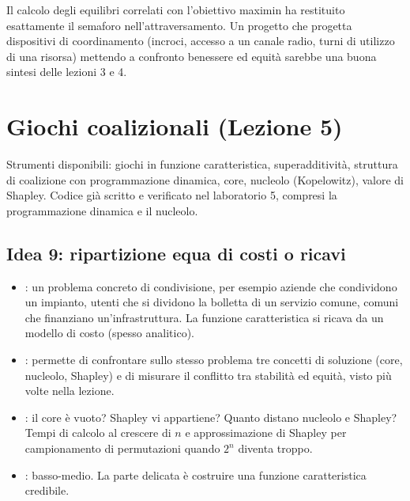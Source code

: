 \documentclass[11pt, a4paper, oneside, openany]{book}
\newcommand{\stato}[2]{\etichetta{#1}{#2}}
\newcommand{\sbloccata}[1]{\stato{blu}{DA LEZIONE #1}}
\begin{document}
\begin{osservazione}
Il calcolo degli equilibri correlati con l'obiettivo maximin ha restituito esattamente il
semaforo nell'attraversamento. Un progetto che progetta dispositivi di coordinamento
(incroci, accesso a un canale radio, turni di utilizzo di una risorsa) mettendo a confronto
benessere ed equità sarebbe una buona sintesi delle lezioni 3 e 4.
\end{osservazione}

\section{Giochi coalizionali (Lezione 5)}

Strumenti disponibili: giochi in funzione caratteristica, superadditività, struttura di
coalizione con programmazione dinamica, core, nucleolo (Kopelowitz), valore di Shapley.
Codice già scritto e verificato nel laboratorio 5, compresi la programmazione dinamica e il
nucleolo.

\subsection*{Idea 9: ripartizione equa di costi o ricavi \hfill\sbloccata{5}}
\begin{itemize}
  \item {}: un problema concreto di condivisione, per esempio aziende che
        condividono un impianto, utenti che si dividono la bolletta di un servizio comune,
        comuni che finanziano un'infrastruttura. La funzione caratteristica si ricava da un
        modello di costo (spesso analitico).
  \item {}: permette di confrontare sullo stesso problema tre
        concetti di soluzione (core, nucleolo, Shapley) e di misurare il conflitto tra
        stabilità ed equità, visto più volte nella lezione.
  \item {}: il core è vuoto? Shapley vi appartiene? Quanto distano nucleolo e
        Shapley? Tempi di calcolo al crescere di $n$ e approssimazione di Shapley per
        campionamento di permutazioni quando $2^n$ diventa troppo.
  \item {}: basso-medio. La parte delicata è costruire una funzione caratteristica
        credibile.
\end{itemize}
\end{document}
